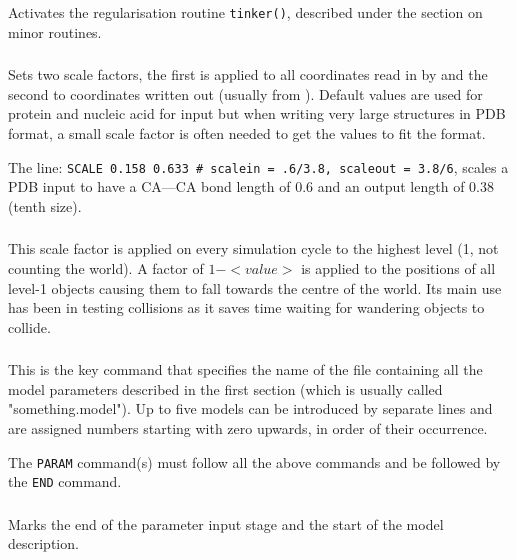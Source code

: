 Activates the regularisation routine {\tt tinker()}, described under the section on
minor routines.

\subsubsection{}

Sets two scale factors, the first is applied to all coordinates read in by  and the
second to coordinates written out (usually from ).  Default values are used for
protein and nucleic acid for input but when writing very large structures in PDB format, a
small scale factor is often needed to get the values to fit the format.

The line: {\tt SCALE 0.158 0.633  \# scalein = .6/3.8, scaleout = 3.8/6}, scales a PDB input
to have a CA---CA bond length of 0.6 and an output length of 0.38 (tenth size).

\subsubsection{}

This scale factor is applied on every simulation cycle to the highest level (1, not counting
the world). A factor of $1-<value>$ is applied to the positions of all level-1 objects causing
them to fall towards the centre of the world.   Its main use has been in testing collisions
as it saves time waiting for wandering objects to collide.

\subsubsection{}

This is the key command that specifies the name of the file containing all the model parameters
described in the first section (which is usually called "something.model").
Up to five models can be introduced by separate  lines and are assigned numbers
starting with zero upwards, in order of their occurrence.

The {\tt PARAM} command(s) must follow all the above commands and be followed by the {\tt END}
command.

\subsubsection{}

Marks the end of the parameter input stage and the start of the model description.




